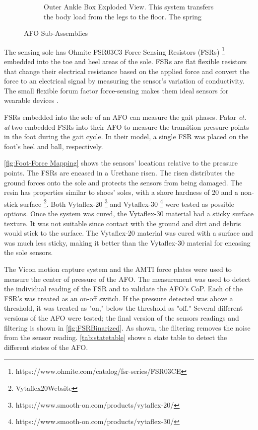 \begin{figure}[h!]
\begin{subfigure}[b]{.45\textwidth}
        \caption{Outer Ankle Box Exploded View. This system transfers the body load from the legs to the floor. The spring }
        \label{fig:Outer Ankle Box fig}
    \end{subfigure}%
    \caption{AFO Sub-Assemblies}
    \label{fig:AFO Sub-Assemblies}
\end{figure}


The sensing sole has Ohmite FSR03C3 Force Sensing Resistors (FSRs) \footnote{https://www.ohmite.com/catalog/fsr-series/FSR03CE} embedded into the toe and heel areas of the sole. FSRs are flat flexible resistors that change their electrical resistance based on the applied force \cite{yaniger1991force} and convert the force to an electrical signal by measuring the sensor's variation of conductivity. The small flexible forum factor force-sensing makes them ideal sensors for wearable devices \cite{giovanelli2016force}.    

FSRs embedded into the sole of an AFO can measure the gait phases. Patar \textit{et. al} two embedded FSRs into their AFO to measure the transition pressure points in the foot during the gait cycle\cite{ab2014system}. In their model, a single FSR was placed on the foot's heel and ball, respectively.  

\autoref{fig:Foot-Force Mapping} shows the sensors' locations relative to the pressure points. The FSRs are encased in a Urethane risen. The risen distributes the ground forces onto the sole and protects the sensors from being damaged. The resin has properties similar to shoes' soles, with a shore hardness of 20 and a non-stick surface \footnote{Vytaflex20Website}. Both Vytaflex-20 \footnote{https://www.smooth-on.com/products/vytaflex-20/} and Vytaflex-30 \footnote{https://www.smooth-on.com/products/vytaflex-30/} were tested as possible options. Once the system was cured, the Vytaflex-30 material had a sticky surface texture. It was not suitable since contact with the ground and dirt and debris would stick to the surface. The Vytaflex-20 material was cured with a surface and was much less sticky, making it better than the Vytaflex-30 material for encasing the sole sensors. 

The Vicon motion capture system and the AMTI force plates were used to measure the center of pressure of the AFO.  The measurement was used to detect the individual reading of the FSR and to validate the AFO's CoP. Each of the FSR's was treated as an on-off switch. If the pressure detected was above a threshold, it was treated as "on," below the threshold as "off."  Several different versions of the AFO were tested; the final version of the sensors readings and filtering is shown in \autoref{fig:FSRBinarized}. As shown, the filtering removes the noise from the sensor reading. \autoref{tab:statetable} shows a state table to detect the different states of the AFO. 

